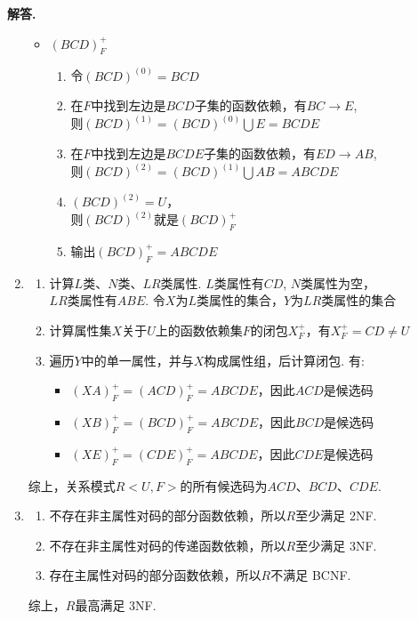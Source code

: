\documentclass[12pt, a4paper, oneside]{ctexart}
\newenvironment{solution}{\par\noindent\textbf{解答. }}{\par}
\begin{document}
\begin{solution}
\begin{enumerate}[(1)]
\begin{itemize}
                \item $(BCD)_F^+$
                \begin{enumerate}[$1^\circ$]
                    \item 令$(BCD)^{(0)} = BCD$
                    \item 在$F$中找到左边是$BCD$子集的函数依赖，有$BC \rightarrow E$, \\
                    则$(BCD)^{(1)} = (BCD)^{(0)}\bigcup E = BCDE$
                    \item 在$F$中找到左边是$BCDE$子集的函数依赖，有$ED \rightarrow AB$, \\
                    则$(BCD)^{(2)} = (BCD)^{(1)}\bigcup AB = ABCDE$
                    \item $(BCD)^{(2)} = U$，\\
                    则$(BCD)^{(2)}$就是$(BCD)_F^+$
                    \item 输出$(BCD)_F^+ = ABCDE$
                \end{enumerate}
            \end{itemize}
        \item 
            \begin{enumerate}[$1^\circ$]
                \item 计算$L$类、$N$类、$LR$类属性. $L$类属性有$CD$, $N$类属性为空，\\
                $LR$类属性有$ABE$. 令$X$为$L$类属性的集合，$Y$为$LR$类属性的集合
                \item 计算属性集$X$关于$U$上的函数依赖集$F$的闭包$X_F^+$，有$X_F^+ = CD \not= U$
                \item 遍历$Y$中的单一属性，并与$X$构成属性组，后计算闭包. 有:
                    \begin{itemize}
                        \item $(XA)_F^+ = (ACD)_F^+ = ABCDE$，因此$ACD$是候选码
                        \item $(XB)_F^+ = (BCD)_F^+ = ABCDE$，因此$BCD$是候选码
                        \item $(XE)_F^+ = (CDE)_F^+ = ABCDE$，因此$CDE$是候选码
                    \end{itemize}
            \end{enumerate}
            综上，关系模式$R<U, F>$的所有候选码为$ACD$、$BCD$、$CDE$.
        \newpage
        \item 
            \begin{enumerate}[$1^\circ$]
                \item 不存在非主属性对码的部分函数依赖，所以$R$至少满足 2NF.
                \item 不存在非主属性对码的传递函数依赖，所以$R$至少满足 3NF.
                \item 存在主属性对码的部分函数依赖，所以$R$不满足 BCNF.
            \end{enumerate}

            综上，$R$最高满足 3NF.
        \end{enumerate}
\end{solution}
\end{document}
